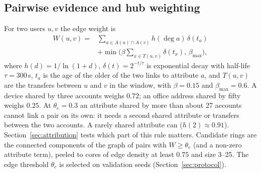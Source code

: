 \subsection{Pairwise evidence and hub weighting}
For two users $u,v$ the edge weight is
\begin{equation}
\begin{split}
W(u,v)={}&\sum_{a\in A(u)\cap A(v)} h(\deg a)\,\delta(t_a)\\
&+\min\Big(\beta\sum_{x\in T(u,v)}\delta(t_x),\,\beta_{\max}\Big),
\end{split}
\label{eq:w}
\end{equation}
where $h(d)=1/\ln(1+d)$, $\delta(t)=2^{-t/\tau}$ is exponential decay with
half-life $\tau=300$\,s, $t_a$ is the age of the older of the two links to
attribute $a$, and $T(u,v)$ are the transfers between $u$ and $v$ in the
window, with $\beta=0.15$ and $\beta_{\max}=0.6$. A device shared by three
accounts weighs $0.72$; an office address shared by fifty weighs $0.25$.
At $\theta_e=0.3$ an attribute shared by more than about 27 accounts cannot
link a pair on its own: it needs a second shared attribute or transfers between
the two accounts. A rarely shared attribute can ($h(2)\approx0.91$).
Section~\ref{sec:attribution} tests which part of this rule matters.
Candidate rings are the connected components of the graph of pairs with
$W\ge\theta_e$ (and a non-zero attribute term), peeled to cores of edge density
at least $0.75$ and size 3--25. The edge threshold $\theta_e$ is selected on
validation seeds (Section~\ref{sec:protocol}).

